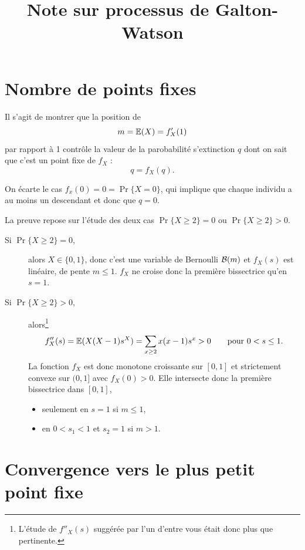 \documentclass[french, 12pt]{article}
\title{Note sur processus de Galton-Watson}
\numberwithin{exercise}{section}
\numberwithin{equation}{section}
\begin{document}


\section{Nombre de points fixes}
Il s'agit de montrer que la position de
$$
m = \operatorname{\mathbb{E}}(X) = f'_X(1)
$$
par rapport à 1 contrôle la valeur de la parobabilité s'extinction $q$ dont on sait que c'est un point fixe de $f_X$ : 
$$
q = f_X(q).
$$

\bigskip
On écarte le cas $f_x(0) = 0 = \Pr\{X = 0\}$, qui implique que chaque individu a au moins un descendant et donc que $q = 0$.

\bigskip
La preuve repose sur l'étude des deux cas $\Pr\{X\geq 2\} = 0$ ou $\Pr\{X\geq 2\} > 0$. 

\begin{description}
  \item[Si $\Pr\{X\geq 2\} = 0$,] alors $X \in \{0, 1\}$, donc c'est une variable de Bernoulli $\mathcal{B}(m)$ et $f_X(s)$ est linéaire, de pente $m \leq 1$. $f_X$ ne croise donc la première bissectrice qu'en $s = 1$.
  \item[Si $\Pr\{X\geq 2\} > 0$,] alors\footnote{L'étude de $f''_X(s)$ suggérée par l'un d'entre vous était donc plus que pertinente.}
  $$
  f''_X(s) = \operatorname{\mathbb{E}}(X(X-1) s^X) = \sum_{x \geq 2} x (x-1) s^x > 0
  \qquad \text{pour } 0 < s \leq 1.
  $$
  La fonction $f_X$ est donc monotone croissante sur $[0, 1]$ et strictement convexe sur $(0, 1]$ avec $f_X(0) > 0$. Elle intersecte donc la première bissectrice dans $[0, 1]$, 
  \begin{itemize}
   \item seulement en $s=1$ si $m \leq 1$, 
   \item en $0 < s_1 < 1$ et $s_2=1$ si $m > 1$. 
  \end{itemize}
\end{description}

\section{Convergence vers le plus petit point fixe}
\end{document}
